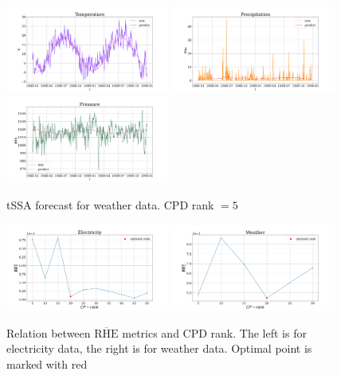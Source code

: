 		\begin{figure}[h]
			\centering
			\includegraphics[width=0.48\textwidth, keepaspectratio]{../../experiments/weather/tssa/figs/prediction/cpd_rank_5/Temperature.png}
			\includegraphics[width=0.48\textwidth, keepaspectratio]{../../experiments/weather/tssa/figs/prediction/cpd_rank_5/Precipitation.png}
			\includegraphics[width=0.48\textwidth, keepaspectratio]{../../experiments/weather/tssa/figs/prediction/cpd_rank_5/Pressure.png}
			\caption{tSSA forecast for weather data. CPD rank $ = 5 $}\label{fig:tssa_weather_pred}
		\end{figure}
		
		\begin{figure}[h]
			\centering
			\includegraphics[width=0.48\textwidth, keepaspectratio]{../../experiments/electricity/tssa/figs/decomposition/RHE_mean.png}
			\includegraphics[width=0.48\textwidth, keepaspectratio]{../../experiments/weather/tssa/figs/decomposition/RHE_mean.png}
			\caption{Relation between $ \overline{\text{RHE}} $ metrics and CPD rank. The left is for electricity data, the right is for weather data. Optimal point is marked with red}\label{fig:decomp_rhe_rank}
		\end{figure}
		
